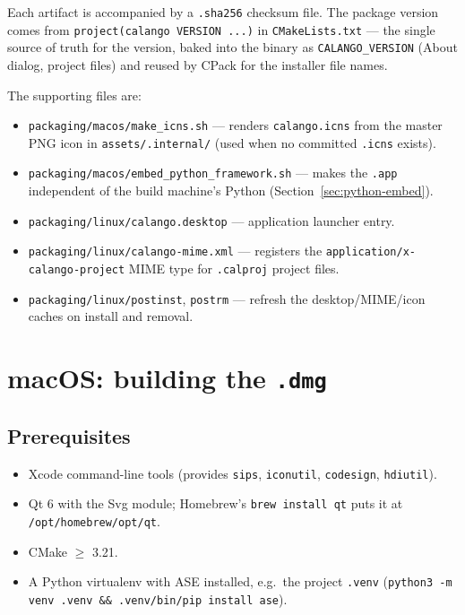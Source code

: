 \documentclass[11pt,a4paper]{article}
\newcommand{\file}[1]{\texttt{#1}}
\newcommand{\opt}[1]{\texttt{#1}}
\begin{document}
Each artifact is accompanied by a \file{.sha256} checksum file. The
package version comes from \opt{project(calango VERSION ...)} in
\file{CMakeLists.txt} --- the single source of truth for the version,
baked into the binary as \opt{CALANGO\_VERSION} (About dialog, project
files) and reused by CPack for the installer file names.

The supporting files are:

\begin{itemize}[itemsep=2pt]
  \item \file{packaging/macos/make\_icns.sh} --- renders
        \file{calango.icns} from the master PNG icon in
        \file{assets/.internal/} (used when no committed \file{.icns}
        exists).
  \item \file{packaging/macos/embed\_python\_framework.sh} --- makes the
        \file{.app} independent of the build machine's Python
        (Section~\ref{sec:python-embed}).
  \item \file{packaging/linux/calango.desktop} --- application launcher entry.
  \item \file{packaging/linux/calango-mime.xml} --- registers the
        \texttt{application/x-calango-project} MIME type for
        \file{.calproj} project files.
  \item \file{packaging/linux/postinst}, \file{postrm} --- refresh the
        desktop/MIME/icon caches on install and removal.
\end{itemize}

\section{macOS: building the \file{.dmg}}

\subsection{Prerequisites}

\begin{itemize}[itemsep=2pt]
  \item Xcode command-line tools (provides \file{sips}, \file{iconutil},
        \file{codesign}, \file{hdiutil}).
  \item Qt 6 with the Svg module; Homebrew's \lstinline|brew install qt|
        puts it at \file{/opt/homebrew/opt/qt}.
  \item CMake $\geq$ 3.21.
  \item A Python virtualenv with ASE installed, e.g.\ the project
        \file{.venv} (\lstinline|python3 -m venv .venv && .venv/bin/pip install ase|).
\end{itemize}
\end{document}
